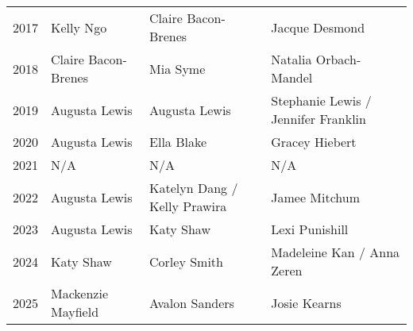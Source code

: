 \begin{table}[htbp]
\begin{tabular}{llll}
2017 & Kelly Ngo & Claire Bacon-Brenes & Jacque Desmond \\
2018 & Claire Bacon-Brenes & Mia Syme & Natalia Orbach-Mandel \\
2019 & Augusta Lewis & Augusta Lewis & Stephanie Lewis / Jennifer Franklin \\
2020 & Augusta Lewis & Ella Blake & Gracey Hiebert \\
2021 & N/A & N/A & N/A \\
2022 & Augusta Lewis & Katelyn Dang / Kelly Prawira & Jamee Mitchum \\
2023 & Augusta Lewis & Katy Shaw & Lexi Punishill \\
2024 & Katy Shaw & Corley Smith & Madeleine Kan / Anna Zeren \\
2025 & Mackenzie Mayfield & Avalon Sanders & Josie Kearns \\
\bottomrule
\end{tabular}
\end{table}

